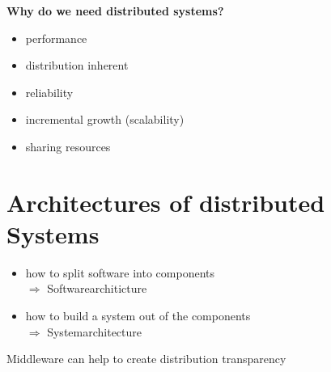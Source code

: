 \documentclass[ngerman,a4paper]{report}
\begin{document}
\textbf{Why do we need distributed systems?}\\
\begin{itemize}
\item performance
\item distribution inherent
\item reliability
\item incremental growth (scalability)
\item sharing resources
\end{itemize}

\section{Architectures of distributed Systems}

\begin{itemize}
\item how to split software into components\\
$\Rightarrow$ Softwarearchiticture
\item how to build a system out of the components\\
$\Rightarrow$ Systemarchitecture
\end{itemize}

Middleware can  help to create distribution transparency\\
\end{document}
